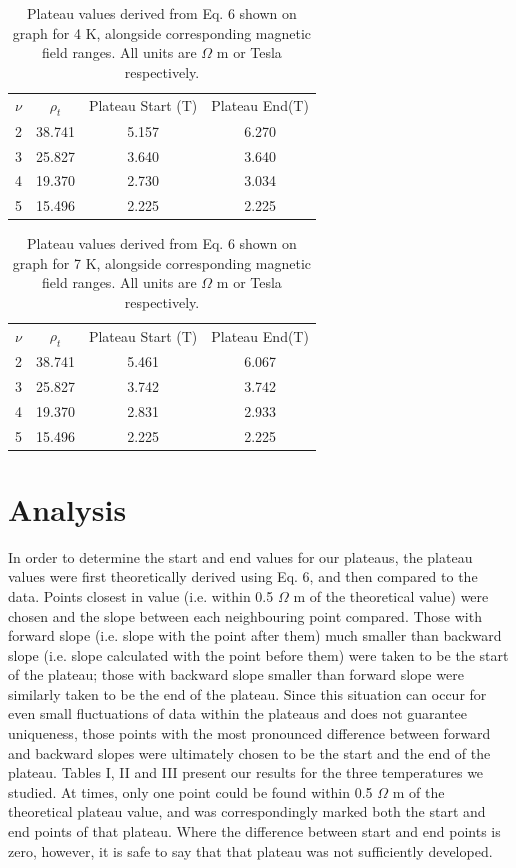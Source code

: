 \documentclass[aps,prl,nofootinbib,twocolumn,superscriptaddress,groupedaddress]{revtex4}  %
\begin{document}
\begin{table}[t]
\caption{Plateau values derived from Eq. 6 shown on graph for 4 K, alongside corresponding magnetic field ranges. All units are $\Omega$ m or Tesla respectively.}
\begin{ruledtabular}
\begin{tabular}{cccc}
$\nu$ & $\rho_{t}$& Plateau Start (T) & Plateau End(T)\\
2 & 38.741& 5.157 & 6.270 \\
3 & 25.827& 3.640 & 3.640 \\
4 & 19.370 & 2.730 & 3.034 \\
5 & 15.496 & 2.225 & 2.225 \\
\end{tabular}
\end{ruledtabular}
\end{table}

\begin{table}[b]
\caption{Plateau values derived from Eq. 6 shown on graph for 7 K, alongside corresponding magnetic field ranges. All units are $\Omega$ m or Tesla respectively.}
\begin{ruledtabular}
\begin{tabular}{cccc}
$\nu$ & $\rho_{t}$& Plateau Start (T) & Plateau End(T)\\
2 & 38.741& 5.461 & 6.067 \\
3 & 25.827& 3.742 & 3.742 \\
4 & 19.370 & 2.831 & 2.933 \\
5 & 15.496 & 2.225 & 2.225 \\
\end{tabular}
\end{ruledtabular}
\end{table}
\vspace{-4\baselineskip}
\section{Analysis}
In order to determine the start and end values for our plateaus, the plateau values were first theoretically derived using Eq. 6, and then compared to the data. Points closest in value (i.e. within 0.5 $\Omega$ m of the theoretical value) were chosen and the slope between each neighbouring point compared. Those with forward slope (i.e. slope with the point after them) much smaller than backward slope (i.e. slope calculated with the point before them) were taken to be the start of the plateau; those with backward slope smaller than forward slope were similarly taken to be the end of the plateau. Since this situation can occur for even small fluctuations of data within the plateaus and does not guarantee uniqueness, those points with the most pronounced difference between forward and backward slopes were ultimately chosen to be the start and the end of the plateau. Tables I, II and III present our results for the three temperatures we studied. At times, only one point could be found within 0.5 $\Omega$ m of the theoretical plateau value, and was correspondingly marked both the start and end points of that plateau. Where the difference between start and end points is zero, however, it is safe to say that that plateau was not sufficiently developed.
\end{document}
